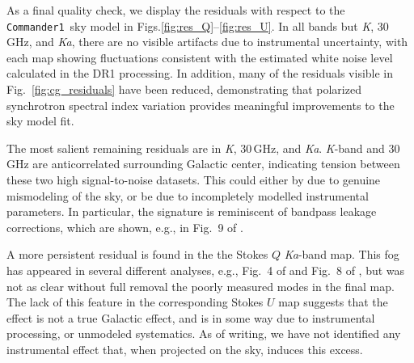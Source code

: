 \documentclass[twocolumn]{../../common/aa}
\def\commanderone{\texttt{Commander1}}
\newcommand{\K}[0]{\textit K}
\newcommand{\Ka}[0]{\textit{Ka}}
\newcommand{\W}[0]{\textit W}
\begin{document}


As a final quality check, we display the residuals with respect to the \commanderone\ sky model in Figs.\ref{fig:res_Q}--\ref{fig:res_U}. In all bands but \K, 30\,GHz, and \Ka, there are no visible artifacts due to instrumental uncertainty, with each map showing fluctuations consistent with the estimated white noise level calculated in the DR1 processing.  In addition, many of the residuals visible in Fig.~\ref{fig:cg_residuals} have been reduced, demonstrating that polarized synchrotron spectral index variation provides meaningful improvements to the sky model fit.

The most salient remaining residuals are in \K, 30\,GHz, and \Ka. \K-band and 30\,GHz are anticorrelated surrounding Galactic center, indicating  tension between these two high signal-to-noise datasets. This could either by due to genuine mismodeling of the sky, or be due to incompletely modelled instrumental parameters. In particular, the signature is reminiscent of bandpass leakage corrections, which are shown, e.g., in Fig.~9 of \citet{bp09}.

A more persistent residual is found in the the Stokes $Q$ \Ka-band map. This fog has appeared in several different analyses, e.g., Fig.~4 of \citet{bp14} and Fig.~8 of \citet{weiland:2022}, but was not as clear without full removal the poorly measured modes in the final map. The lack of this feature in the corresponding Stokes $U$ map suggests that the effect is not a true Galactic effect, and is in some way due to instrumental processing, or unmodeled systematics. As of writing, we have not identified any instrumental effect that, when projected on the sky, induces this excess.

%
\end{document}
